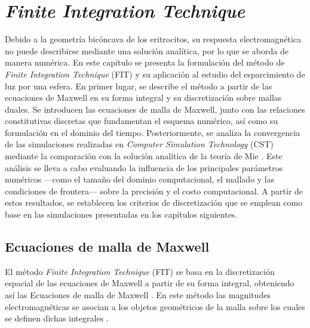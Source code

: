 
\chapter{\textit{Finite Integration Technique}}
\label{chapter:FIT}

\vspace*{7em}

%
%

Debido a la geometría bicóncava de los eritrocitos, su respuesta electromagnética no puede describirse mediante una solución analítica, por lo que se aborda de manera numérica. En este capítulo se presenta la formulación del método de \textit{Finite Integration Technique} (FIT) y su aplicación al estudio del esparcimiento de luz por una esfera. En primer lugar, se describe el método a partir de las ecuaciones de Maxwell en su forma integral y su discretización sobre mallas duales. Se introducen las ecuaciones de malla de Maxwell, junto con las relaciones constitutivas discretas que fundamentan el esquema numérico, así como su formulación en el dominio del tiempo. Posteriormente, se analiza la convergencia de las simulaciones realizadas en \textit{Computer Simulation Technology} (CST) mediante la comparación con la solución analítica de la teoría de Mie \cite{bohrenAbsorptionScatteringLight2008}. Este análisis se lleva a cabo evaluando la influencia de los principales parámetros numéricos —como el tamaño del dominio computacional, el mallado y las condiciones de frontera— sobre la precisión y el costo computacional. A partir de estos resultados, se establecen los criterios de discretización que se emplean como base en las simulaciones presentadas en los capítulos siguientes.




\section{Ecuaciones de malla de Maxwell}
\label{section:MGE}

El método \textit{Finite Integration Technique} (FIT) se basa en la discretización espacial de las ecuaciones de Maxwell a partir de su forma integral, obteniendo así las Ecuaciones de malla de Maxwell \cite{clemensDiscreteElectromagnetismFinite2001}. En este método las magnitudes electromagnéticas se asocian a los objetos geométricos de la malla sobre los cuales se definen dichas integrales \cite{dassaultsystemesCSTMicrowaveStudio2003}.

